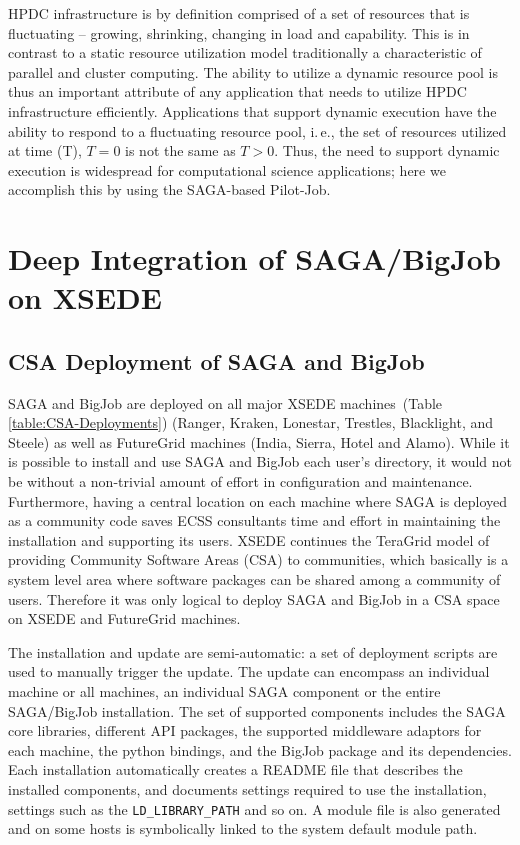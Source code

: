 \documentclass{sig-alternate}
\begin{document}
HPDC infrastructure is by definition comprised of a set of resources
that is fluctuating -- growing, shrinking, changing in load and
capability. This is in contrast to a static resource utilization model
traditionally a characteristic of parallel and cluster computing. The
ability to utilize a dynamic resource pool is thus an important
attribute of any application that needs to utilize HPDC infrastructure
efficiently. Applications that support dynamic execution have the
ability to respond to a fluctuating resource pool, i.\,e., the set of
resources utilized at time (T), $T=0$ is not the same as $T>0$.  Thus,
the need to support dynamic execution is widespread for computational
science applications; here we accomplish this by using the SAGA-based
Pilot-Job.

\section{Deep Integration of SAGA/BigJob on XSEDE}

\subsection{CSA Deployment of SAGA and BigJob}
 \label{ssec:csa}
 
SAGA and BigJob are deployed on all major XSEDE
machines~(Table \ref{table:CSA-Deployments}) (Ranger,
Kraken, Lonestar, Trestles, Blacklight, and Steele) as well as FutureGrid machines
(India, Sierra, Hotel and Alamo). While it is possible to install and
use SAGA and BigJob each user's directory, it would not be without a non-trivial
amount of effort in configuration and maintenance. Furthermore, having a
central location on each machine where SAGA is deployed as a community code
saves ECSS consultants time and effort in maintaining the installation and
supporting its users. XSEDE continues the TeraGrid model of providing Community
Software Areas (CSA) to communities, which basically is a system
level area where software packages can be shared among a community of users.
Therefore it was only logical to deploy SAGA and BigJob in a CSA space on XSEDE
and FutureGrid machines.

The installation and update are semi-automatic: a set of deployment
scripts are used to manually trigger the update. The update can encompass an
individual machine or all machines, an individual SAGA component or the entire
SAGA/BigJob installation. The set of supported components includes the SAGA core
libraries, different API packages, the supported
middleware adaptors for each machine, the python bindings, and the
BigJob package and its dependencies. Each installation automatically creates a
README file that describes the installed components, and documents settings
required to use the installation, settings such as the
\texttt{LD\_LIBRARY\_PATH} and so on. A module file is also generated and on
some hosts is symbolically linked to the system default module path. 
\end{document}
